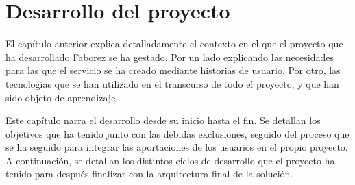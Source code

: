 \documentclass[main]{subfiles}
\begin{document}
\chapter{Desarrollo del proyecto}

El capítulo anterior explica detalladamente el contexto en el que el proyecto que ha desarrollado Faborez se ha gestado. Por un lado explicando las necesidades para las que el servicio se ha creado mediante historias de usuario. Por otro, las tecnologías que se han utilizado en el transcurso de todo el proyecto, y que han sido objeto de aprendizaje.

Este capítulo narra el desarrollo desde su inicio hasta el fin. Se detallan los objetivos que ha tenido junto con las debidas exclusiones, seguido del proceso que se ha seguido para integrar las aportaciones de los usuarios en el propio proyecto. A continuación, se detallan los distintos ciclos de desarrollo que el proyecto ha tenido para después finalizar con la arquitectura final de la solución.









\end{document}
